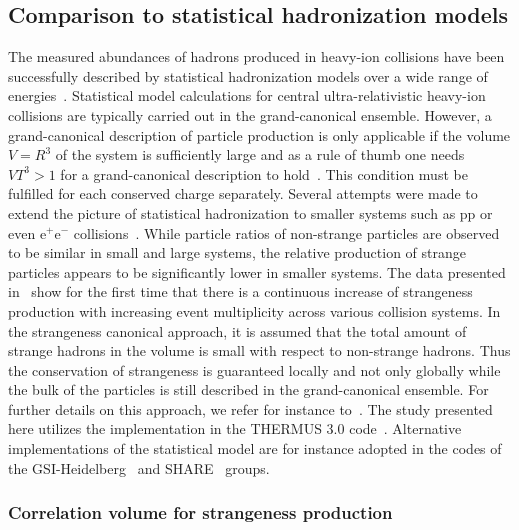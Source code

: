 \subsection{\label{subsecSHM}Comparison to statistical hadronization models}

The measured abundances of hadrons produced in heavy-ion collisions have been successfully described by statistical hadronization models over a wide range of energies~\cite{Andronic:2011yq,Cleymans:1998fq,Andronic:2005yp}. Statistical model calculations for central ultra-relativistic heavy-ion collisions are typically carried out in the grand-canonical ensemble. However, a grand-canonical description of particle production is only applicable if the volume $V=R^{3}$ of the system is sufficiently large and as a rule of thumb one needs $VT^{3} > 1$ for a grand-canonical description to hold~\cite{Hagedorn:1984uy,Rafelski:1980gk}. This condition must be fulfilled for each conserved charge separately.
Several attempts were made to extend the picture of statistical hadronization to smaller systems such as pp or even e$^{+}$e$^{-}$ collisions~\cite{Redlich:2009xx,Becattini:1996gy,Kraus:2008fh}. While particle ratios of non-strange particles are observed to be similar in small and large systems, the relative production of strange particles appears to be significantly lower in smaller systems. The data presented in~\cite{Adam:2016emw} show for the first time that there is a continuous increase of strangeness production with increasing event multiplicity across various collision systems. In the strangeness canonical approach, it is assumed that the total amount of strange hadrons in the volume is small with respect to non-strange hadrons. Thus the conservation of strangeness is guaranteed locally and not only globally while the bulk of the particles is still described in the grand-canonical ensemble. For further details on this approach, we refer for instance to~\cite{BraunMunzinger:2003zd,Hamieh:2000tk,Cleymans:2004bf}. The study presented here utilizes the implementation in the THERMUS 3.0 code~\cite{Wheaton:2004qb}. Alternative implementations of the statistical model are for instance adopted in the codes of the GSI-Heidelberg~\cite{Andronic:2005yp,Andronic:2017pug} and SHARE~\cite{PETRAN20142056} groups.


\subsubsection{Correlation volume for strangeness production} 

